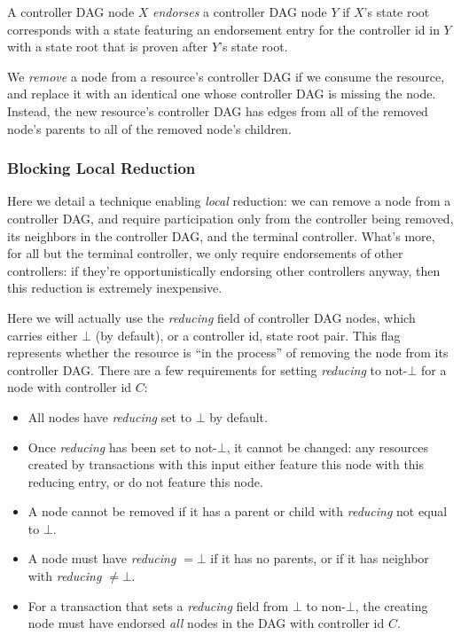 \documentclass[a4paper,USenglish,cleveref, autoref, thm-restate, anonymous]{lipics-v2021}
\begin{document}
\begin{definition}[Endorsement]
A controller DAG node $X$ \textit{endorses} a controller DAG node $Y$ if $X$'s state root corresponds with a state featuring an endorsement entry for the controller id in $Y$ with a state root that is proven after $Y$'s state root. 
\end{definition}

\begin{definition}[Remove]
We \textit{remove} a node from a resource's controller DAG if we consume the resource, and replace it with an identical one whose controller DAG is missing the node. 
Instead, the new resource's controller DAG has edges from all of the removed node's parents to all of the removed node's children.
\end{definition}


\subsubsection{Blocking Local Reduction}
\label{sec:blockinglocalreduction}
Here we detail a technique enabling \emph{local} reduction: we can remove a node from a controller DAG, and require participation only from the controller being removed, its neighbors in the controller DAG, and the terminal controller. 
What's more, for all but the terminal controller, we only require endorsements of other controllers: if they're opportunistically endorsing other controllers anyway, then this reduction is extremely inexpensive.

Here we will actually use the \textit{reducing} field of controller DAG nodes, which carries either $\bot$ (by default), or a controller id, state root pair.
This flag represents whether the resource is ``in the process'' of removing the node from its controller DAG.
There are a few requirements for setting \textit{reducing} to not-$\bot$ for a node with controller id $C$:
\begin{itemize}
\item All nodes have \textit{reducing} set to $\bot$ by default. 
\item Once \textit{reducing} has been set to not-$\bot$, it cannot be changed: any resources created by transactions with this input either feature this node with this reducing entry, or do not feature this node.
\item A node cannot be removed if it has a parent or child with \textit{reducing} not equal to $\bot$. 
\item A node must have \textit{reducing}  $=\bot$ if it has no parents, or if it has neighbor with \textit{reducing} $\ne\bot$. 
\item For a transaction that sets a \textit{reducing} field from $\bot$ to non-$\bot$, the creating node must have endorsed \textit{all} nodes in the DAG with controller id $C$.
\end{itemize}
\end{document}
